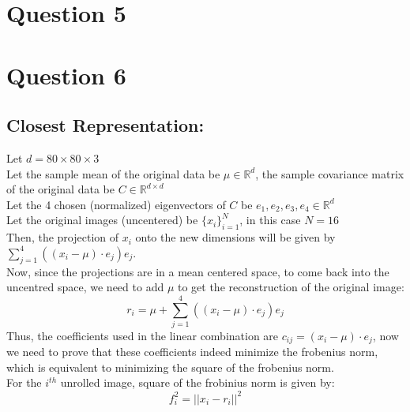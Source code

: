 \documentclass[11pt, fleqn]{article}
\begin{document}
\newpage
\section*{Question 5}
\setcounter{equation}{0}
\setcounter{figure}{0}

\newpage
\section*{Question 6}
\setcounter{equation}{0}
\setcounter{figure}{0}
\subsection*{Closest Representation:}
Let $d = 80\times80\times3$\\
Let the sample mean of the original data be $\mu \in \mathbb{R}^d$, the sample covariance matrix of the original data be $C \in \mathbb{R}^{d\times d}$\\
Let the 4 chosen (normalized) eigenvectors of $C$ be $e_1, e_2, e_3, e_4 \in \mathbb{R}^d$\\ 
Let the original images (uncentered) be $\{x_i\}_{i=1}^N$, in this case $N = 16$\\
Then, the projection of $x_i$ onto the new dimensions will be given by $\sum_{j=1}^{4}((x_i - \mu)\cdot e_j)e_j$.\\
Now, since the projections are in a mean centered space, to come back into the uncentred space, we need to add $\mu$ to get the reconstruction of the original image:
$$
    \boxed{r_i = \mu + \sum_{j=1}^{4}((x_i - \mu)\cdot e_j)e_j}
$$
Thus, the coefficients used in the linear combination are $\boxed{c_{ij} = (x_i - \mu)\cdot e_j}$, now we need to prove that these coefficients indeed minimize the frobenius norm, which is equivalent to minimizing the square of the frobenius norm.\\

For the $i^{th}$ unrolled image, square of the frobinius norm is given by:
$$ 
    f_i^2 = ||x_i - r_i||^2 
$$
\end{document}
